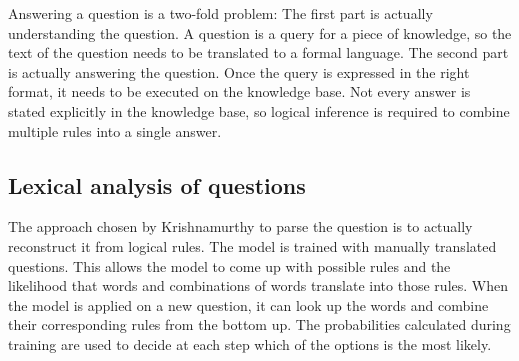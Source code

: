 Answering a question is a two-fold problem: The first part is actually understanding the question. A question is a query for a piece of knowledge, so the text of the question needs to be translated to a formal language. The second part is actually answering the question. Once the query is expressed in the right format, it needs to be executed on the knowledge base. Not every answer is stated explicitly in the knowledge base, so logical inference is required to combine multiple rules into a single answer. 
\subsection{Lexical analysis of questions}
The approach chosen by Krishnamurthy \cite{probseman} to parse the question is to actually reconstruct it from logical rules. The model is trained with manually translated questions. This allows the model to come up with possible rules and the likelihood that words and combinations of words translate into those rules. When the model is applied on a new question, it can look up the words and combine their corresponding rules from the bottom up. The probabilities calculated during training are used to decide at each step which of the options is the most likely.



